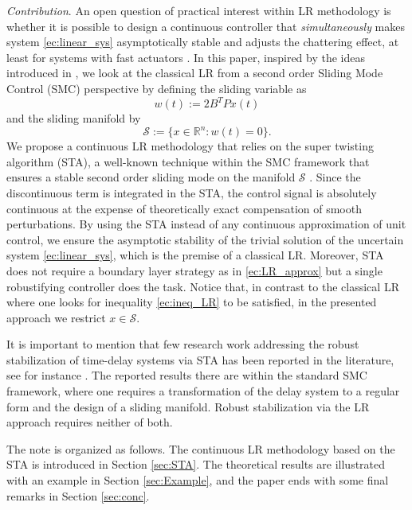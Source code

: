 \documentclass[onecolumn]{IEEEtran}
\begin{document}
\textit{Contribution}. An open question of practical interest within LR methodology is whether it is possible to  design a continuous controller that { \textit{simultaneously} makes system \eqref{ec:linear_sys} asymptotically stable and adjusts the chattering effect, at least for systems with fast actuators \cite{PerezFridman2019}}. In this paper, inspired by the ideas introduced in \cite{SuDrakonov1996,Estradaetal2020},  we look at  the classical LR  from a second order Sliding Mode Control (SMC) perspective by defining the sliding variable as 
\begin{equation}
\label{ec:sliding_var}
w(t):=2B^TPx(t)
\end{equation}
and the sliding manifold by
\begin{equation*}
\mathcal{S}:=\{x\in \mathbb{R}^n: w(t)=0 \}.
\end{equation*}
We propose a continuous LR methodology that relies on the super twisting algorithm (STA), a well-known technique within the SMC framework that ensures a stable second order sliding mode on the manifold $\mathcal{S}$  \cite{Levant1993,Moreno2011, MorenoOsorio2012, Vidaletal2016}. Since  the discontinuous term is integrated in the STA, the control signal is absolutely continuous at the expense of theoretically exact compensation of smooth perturbations.  By using  the STA instead of any continuous approximation of unit control, we ensure the asymptotic stability of the trivial solution of the uncertain system \eqref{ec:linear_sys}, which is the premise of a classical LR. Moreover,  STA does not  require a boundary layer strategy as in \eqref{ec:LR_approx} but a single robustifying controller does  the task. Notice that, in contrast to the classical LR where one looks for inequality \eqref{ec:ineq_LR} to be satisfied, in the presented approach  we restrict $x\in \mathcal{S}$. 

It is important to mention that few research work addressing the robust stabilization of time-delay systems via STA has been reported in the literature, see for instance \cite{WaaaahJeronimo2019, Caballero2018}. The reported results there are within the standard SMC framework, where one requires a transformation of the delay system to a regular form and the design of a sliding manifold.  Robust stabilization via the LR approach  requires neither  of both.



The note is organized as follows. The continuous LR methodology based on the STA is introduced in Section \ref{sec:STA}. The theoretical results are illustrated with an example  in Section \ref{sec:Example}, and   the paper ends with some final remarks in Section \ref{sec:conc}.
\end{document}

